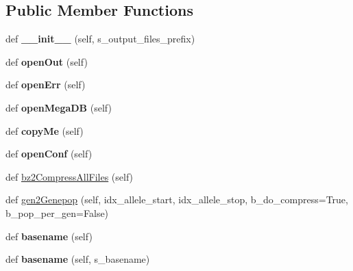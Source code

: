 \subsection*{Public Member Functions}
\begin{DoxyCompactItemize}
\item 
def {\bfseries \+\_\+\+\_\+init\+\_\+\+\_\+} (self, s\+\_\+output\+\_\+files\+\_\+prefix)\hypertarget{classnegui_1_1pgoutputsimupop_1_1PGOutputSimuPop_a8f42fc0afc9024177960bb6287e45493}{}\label{classnegui_1_1pgoutputsimupop_1_1PGOutputSimuPop_a8f42fc0afc9024177960bb6287e45493}

\item 
def {\bfseries open\+Out} (self)\hypertarget{classnegui_1_1pgoutputsimupop_1_1PGOutputSimuPop_a7cea46f9212d05e98ce14b7647781590}{}\label{classnegui_1_1pgoutputsimupop_1_1PGOutputSimuPop_a7cea46f9212d05e98ce14b7647781590}

\item 
def {\bfseries open\+Err} (self)\hypertarget{classnegui_1_1pgoutputsimupop_1_1PGOutputSimuPop_ae3f0c28a1a9afbef82fddd8d26d3ea3b}{}\label{classnegui_1_1pgoutputsimupop_1_1PGOutputSimuPop_ae3f0c28a1a9afbef82fddd8d26d3ea3b}

\item 
def {\bfseries open\+Mega\+DB} (self)\hypertarget{classnegui_1_1pgoutputsimupop_1_1PGOutputSimuPop_afac367cb22b4498a2c5170173de1bdc1}{}\label{classnegui_1_1pgoutputsimupop_1_1PGOutputSimuPop_afac367cb22b4498a2c5170173de1bdc1}

\item 
def {\bfseries copy\+Me} (self)\hypertarget{classnegui_1_1pgoutputsimupop_1_1PGOutputSimuPop_a5ab021b0ff9d452891a52313b9402fbf}{}\label{classnegui_1_1pgoutputsimupop_1_1PGOutputSimuPop_a5ab021b0ff9d452891a52313b9402fbf}

\item 
def {\bfseries open\+Conf} (self)\hypertarget{classnegui_1_1pgoutputsimupop_1_1PGOutputSimuPop_abd8a699e5a3adf2b746bdb778602fe60}{}\label{classnegui_1_1pgoutputsimupop_1_1PGOutputSimuPop_abd8a699e5a3adf2b746bdb778602fe60}

\item 
def \hyperlink{classnegui_1_1pgoutputsimupop_1_1PGOutputSimuPop_a19aedb58718296302655581be640f995}{bz2\+Compress\+All\+Files} (self)
\item 
def \hyperlink{classnegui_1_1pgoutputsimupop_1_1PGOutputSimuPop_af093f63ef577cb9d9778920ec6589516}{gen2\+Genepop} (self, idx\+\_\+allele\+\_\+start, idx\+\_\+allele\+\_\+stop, b\+\_\+do\+\_\+compress=True, b\+\_\+pop\+\_\+per\+\_\+gen=False)
\item 
def {\bfseries basename} (self)\hypertarget{classnegui_1_1pgoutputsimupop_1_1PGOutputSimuPop_af67ba734fbe5d4240a8cef38e63586d1}{}\label{classnegui_1_1pgoutputsimupop_1_1PGOutputSimuPop_af67ba734fbe5d4240a8cef38e63586d1}

\item 
def {\bfseries basename} (self, s\+\_\+basename)\hypertarget{classnegui_1_1pgoutputsimupop_1_1PGOutputSimuPop_aafca25668d51a1beec732306b7973884}{}\label{classnegui_1_1pgoutputsimupop_1_1PGOutputSimuPop_aafca25668d51a1beec732306b7973884}

\end{DoxyCompactItemize}
